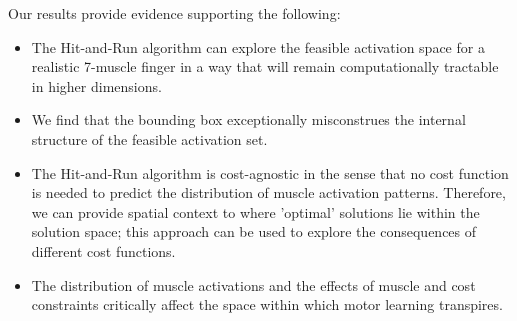 Our results provide evidence supporting the following:
\begin{itemize}
	\item{The Hit-and-Run algorithm can explore the feasible activation space for a realistic 7-muscle finger in a way that will remain computationally tractable in higher dimensions.}
	\item{We find that the bounding box exceptionally misconstrues the internal structure of the feasible activation set.}
	\item{The Hit-and-Run algorithm is cost-agnostic in the sense that no cost function is needed to predict the distribution of muscle activation patterns.
	Therefore, we can provide spatial context to where 'optimal' solutions lie within the solution space; this approach can be used to explore the consequences of different cost functions.}
	\item{The distribution of muscle activations and the effects of muscle and cost constraints critically affect the space within which motor learning transpires.}
\end{itemize}

